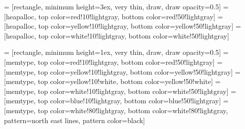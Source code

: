   = [rectangle, minimum height=3ex, very thin, draw, draw opacity=0.5]
 = [heapalloc, top color=red!10!lightgray,
                                     bottom color=red!50!lightgray]
 = [heapalloc, top color=yellow!10!lightgray,
                                     bottom color=yellow!50!lightgray]
  = [heapalloc, top color=white!10!lightgray,
                                     bottom color=white!50!lightgray]

     = [rectangle, minimum height=1ex, very thin, draw,
                           draw opacity=0.5]
     = [memtype, top color=red!10!lightgray,
                                    bottom color=red!50!lightgray]
     = [memtype, top color=yellow!10!lightgray,
                                    bottom color=yellow!50!lightgray]
   = [memtype, top color=yellow!10!white,
                                    bottom color=yellow!50!white]
    = [memtype, top color=white!10!lightgray,
                                    bottom color=white!50!lightgray]
  = [memtype, top color=blue!10!lightgray,
                                    bottom color=blue!50!lightgray]
 = [memtype, top color=white!80!lightgray,
                                    bottom color=white!80!lightgray,
                                    pattern=north east lines,
                                    pattern color=black]


\newenvironment{wheel}[1] {

	\newcommand{\slices}[2]{
		\foreach \i in {##1} {
			\path[##2]
				(\i + 2:#1*0.2)  -- (\i + 2:#1*0.95) --
				(\i + 8:#1*0.95) -- (\i + 8:#1*0.2) --cycle;
		}
	}

	\newcommand{\rememberouter}[2]{
		\path (##1 + 5:#1*0.95) coordinate (##2) {}; }

	\newcommand{\rememberinner}[2]{
		\path (##1 + 5:#1*0.85) coordinate (##2) {}; }

	\begin{tikzpicture}

		\path[draw, draw opacity=0.4, inner color=white, outer color=white!80!black, even odd rule]
			(0,0) circle (#1);

		\foreach \i in {0, 10,...,350} {
			\path[white, draw, draw opacity=0.5] (0,0) -- (\i:#1); }

} {
	\end{tikzpicture}
}


